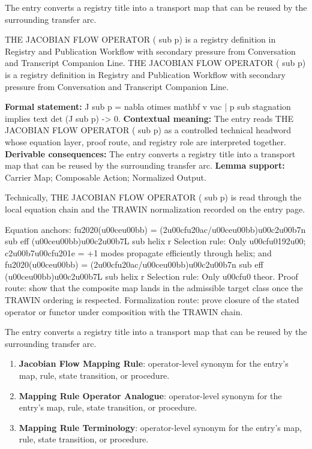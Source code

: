 The entry converts a registry title into a transport map that can be reused by the surrounding transfer arc.
\clearpage


\begingroup\small
{}
THE JACOBIAN FLOW OPERATOR (  sub p) is a registry definition in Registry and Publication Workflow with secondary pressure from Conversation and Transcript Companion Line. THE JACOBIAN FLOW OPERATOR ( sub p) is a registry definition in Registry and Publication Workflow with secondary pressure from Conversation and Transcript Companion Line.

\begingroup\footnotesize\setlength{\emergencystretch}{3em}\sloppy
\textbf{Formal statement:} J sub p = nabla otimes mathbf v vac | p sub stagnation implies text det (J sub p) -> 0. \textbf{Contextual meaning:} The entry reads THE JACOBIAN FLOW OPERATOR (  sub p) as a controlled technical headword whose equation layer, proof route, and registry role are interpreted together. \textbf{Derivable consequences:} The entry converts a registry title into a transport map that can be reused by the surrounding transfer arc. \textbf{Lemma support:} Carrier Map; Composable Action; Normalized Output.\par
\endgroup

Technically, THE JACOBIAN FLOW OPERATOR ( sub p) is read through the local equation chain and the TRAWIN normalization recorded on the entry page.

Equation anchors: fu2020(u00ceu00bb) = (2u00cfu20ac/u00ceu00bb)u00c2u00b7n sub eff (u00ceu00bb)u00c2u00b7L sub helix r Selection rule: Only u00cfu0192u00; c2u00b7u00cfu201e = +1 modes propagate efficiently through helix; and fu2020(u00ceu00bb) = (2u00cfu20ac/u00ceu00bb)u00c2u00b7n sub eff (u00ceu00bb)u00c2u00b7L sub helix r Selection rule: Only u00cfu0 theor. Proof route: show that the composite map lands in the admissible target class once the TRAWIN ordering is respected. Formalization route: prove closure of the stated operator or functor under composition with the TRAWIN chain.

The entry converts a registry title into a transport map that can be reused by the surrounding transfer arc.
\endgroup

\begin{enumerate}[leftmargin=1.6em,itemsep=6pt,topsep=4pt]
\item \textbf{Jacobian Flow Mapping Rule}: operator-level synonym for the entry's map, rule, state transition, or procedure.
\item \textbf{Mapping Rule Operator Analogue}: operator-level synonym for the entry's map, rule, state transition, or procedure.
\item \textbf{Mapping Rule Terminology}: operator-level synonym for the entry's map, rule, state transition, or procedure.
\end{enumerate}

